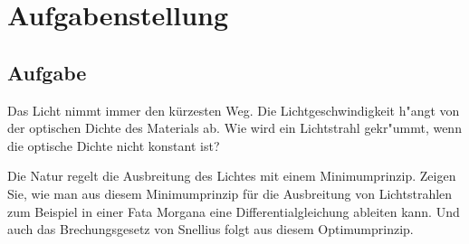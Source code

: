 \section{Aufgabenstellung}

\subsection{Aufgabe}
Das Licht nimmt immer den kürzesten Weg.
Die Lichtgeschwindigkeit
h"angt von der optischen Dichte des Materials ab.
Wie wird ein Lichtstrahl gekr"ummt, wenn die optische Dichte
nicht konstant ist?

{\parindent 0pt Die Natur regelt die Ausbreitung des Lichtes mit einem
Minimumprinzip.} Zeigen Sie, wie man aus diesem Minimumprinzip
für die Ausbreitung von Lichtstrahlen zum Beispiel in einer Fata Morgana
eine Differentialgleichung ableiten kann. Und auch das
Brechungsgesetz von Snellius folgt aus diesem Optimumprinzip.
